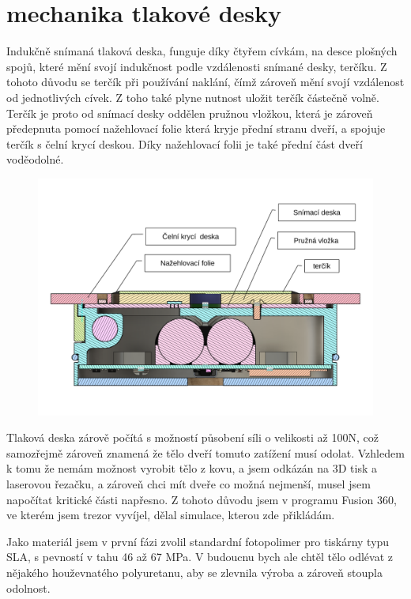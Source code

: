 \section*{mechanika tlakové desky}

Indukčně snímaná tlaková deska, funguje díky čtyřem cívkám, na desce plošných spojů, které mění svojí indukčnost podle vzdálenosti snímané desky, terčíku.
Z tohoto důvodu se terčík při používání naklání, čímž zároveň mění svojí vzdálenost od jednotlivých cívek. Z toho také plyne nutnost uložit terčík
částečně volně. Terčík je proto od snímací desky oddělen pružnou vložkou, která je zároveň předepnuta pomocí nažehlovací folie která kryje přední 
stranu dveří, a spojuje terčík s čelní krycí deskou. Díky nažehlovací folii je také přední část dveří voděodolné.

\begin{figure}[htbp]
    \centering
    \includegraphics[width=\textwidth]{kapitoly/obrazky/tlakova_deska/rez_po_ose.pdf}
    \label{fig:M1}
\end{figure}

Tlaková deska zárově počítá s možností působení síli o velikosti až 100N, což samozřejmě zároveň znamená že tělo dveří tomuto zatížení musí odolat.
Vzhledem k tomu že nemám možnost vyrobit tělo z kovu, a jsem odkázán na 3D tisk a laserovou řezačku, a zároveň chci mít dveře co možná nejmenší,
musel jsem napočítat kritické části napřesno. Z tohoto důvodu jsem v programu Fusion 360, ve kterém jsem trezor vyvíjel,
dělal simulace, kterou zde přikládám. 

Jako materiál jsem v první fázi zvolil standardní fotopolimer pro tiskárny typu SLA, s pevností v tahu 46 až 67 MPa.
V budoucnu bych ale chtěl tělo odlévat z nějakého houževnatého polyuretanu, aby se zlevnila výroba a zároveň stoupla odolnost.

